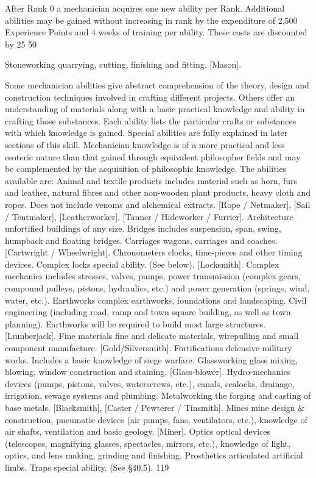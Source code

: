 \documentclass[a4paper]{article}
\begin{document}
\begin{multicols}{3}
After Rank 0 a mechanician acquires one new
ability per Rank. Additional abilities may be
gained without increasing in rank by the expenditure of 2,500 Experience Points and 4 weeks of
training per ability. These costs are discounted by
25%
50%

Stoneworking quarrying, cutting, finishing and
fitting. [Mason].

Some mechanician abilities give abstract comprehension of the theory, design and construction
techniques involved in crafting different projects.
Others offer an understanding of materials along
with a basic practical knowledge and ability in
crafting those substances. Each ability lists the
particular crafts or substances with which knowledge is gained. Special abilities are fully explained
in later sections of this skill.
Mechanician knowledge is of a more practical and
less esoteric nature than that gained through
equivalent philosopher fields and may be complemented by the acquisition of philosophic knowledge.
The abilities available are:
Animal and textile products includes material
such as horn, furs and leather, natural fibres and
other non-wooden plant products, heavy cloth and
ropes. Does not include venoms and alchemical
extracts. [Rope / Netmaker], [Sail / Tentmaker],
[Leatherworker], [Tanner / Hideworker / Furrier].
Architecture unfortified buildings of any size.
Bridges includes suspension, span, swing, humpback and floating bridges.
Carriages wagons, carriages and coaches. [Cartwright / Wheelwright].
Chronometers clocks, time-pieces and other timing devices. Complex locks special ability. (See
below). [Locksmith]. Complex mechanics includes
stresses, valves, pumps, power transmission (complex gears, compound pulleys, pistons, hydraulics,
etc.) and power generation (springs, wind, water,
etc.).
Earthworks complex earthworks, foundations and
landscaping. Civil engineering (including road,
ramp and town square building, as well as town
planning). Earthworks will be required to build
most large structures. [Lumberjack].
Fine materials fine and delicate materials, wirepulling and small component manufacture.
[Gold/Silversmith].
Fortifications defensive military works. Includes a
basic knowledge of siege warfare.
Glassworking glass mixing, blowing, window
construction and staining. [Glass-blower].
Hydro-mechanics devices (pumps, pistons,
valves, waterscrews, etc.), canals, sealocks, drainage, irrigation, sewage systems and plumbing.
Metalworking the forging and casting of base
metals. [Blacksmith], [Caster / Pewterer / Tinsmith].
Mines mine design & construction, pneumatic
devices (air pumps, fans, ventilators, etc.), knowledge of air shafts, ventilation and basic geology.
[Miner].
Optics optical devices (telescopes, magnifying
glasses, spectacles, mirrors, etc.), knowledge of
light, optics, and lens making, grinding and finishing.
Prosthetics articulated artificial limbs.
Traps special ability. (See §40.5).
119


\end{multicols}
\end{document}
